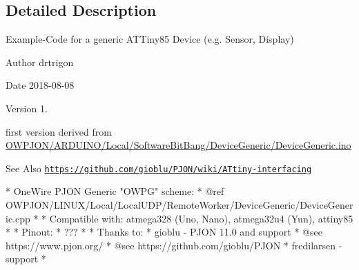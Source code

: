\subsection{Detailed Description}
Example-\/\-Code for a generic A\-T\-Tiny85 Device (e.\-g. Sensor, Display) \begin{DoxyAuthor}{Author}
drtrigon 
\end{DoxyAuthor}
\begin{DoxyDate}{Date}
2018-\/08-\/08 
\end{DoxyDate}
\begin{DoxyVersion}{Version}
1. \begin{DoxyItemize}
\item first version derived from \hyperlink{ARDUINO_2Local_2SoftwareBitBang_2DeviceGeneric_2DeviceGeneric_8ino}{O\-W\-P\-J\-O\-N/\-A\-R\-D\-U\-I\-N\-O/\-Local/\-Software\-Bit\-Bang/\-Device\-Generic/\-Device\-Generic.\-ino} \end{DoxyItemize}

\end{DoxyVersion}
\begin{DoxySeeAlso}{See Also}
\href{https://github.com/gioblu/PJON/wiki/ATtiny-interfacing}{\tt https\-://github.\-com/gioblu/\-P\-J\-O\-N/wiki/\-A\-Ttiny-\/interfacing}
\end{DoxySeeAlso}
\begin{DoxyVerb}* OneWire PJON Generic "OWPG" scheme:
*   @ref OWPJON/LINUX/Local/LocalUDP/RemoteWorker/DeviceGeneric/DeviceGeneric.cpp
*
* Compatible with: atmega328 (Uno, Nano), atmega32u4 (Yun), attiny85
*
* Pinout:
*   ???
*
* Thanks to:
* gioblu - PJON 11.0 and support
*          @see https://www.pjon.org/
*          @see https://github.com/gioblu/PJON
* fredilarsen - support
* \end{DoxyVerb}
 

